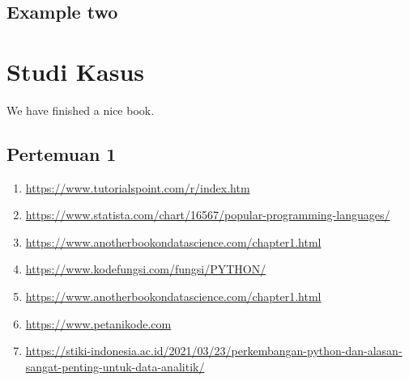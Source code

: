 \documentclass[
]{docs}
\providecommand{\tightlist}{%
  \setlength{\itemsep}{0pt}\setlength{\parskip}{0pt}}
\begin{document}
\hypertarget{example-two}{%
\subsection{Example two}\label{example-two}}

\hypertarget{studi-kasus}{%
\section{Studi Kasus}\label{studi-kasus}}

We have finished a nice book.

\hypertarget{pertemuan-1}{%
\subsection{Pertemuan 1}\label{pertemuan-1}}

\begin{enumerate}
\def\labelenumi{\arabic{enumi}.}
\tightlist
\item
  \url{https://www.tutorialspoint.com/r/index.htm}
\item
  \url{https://www.statista.com/chart/16567/popular-programming-languages/}
\item
  \url{https://www.anotherbookondatascience.com/chapter1.html}
\item
  \url{https://www.kodefungsi.com/fungsi/PYTHON/}
\item
  \url{https://www.anotherbookondatascience.com/chapter1.html}
\item
  \url{https://www.petanikode.com}
\item
  \url{https://stiki-indonesia.ac.id/2021/03/23/perkembangan-python-dan-alasan-sangat-penting-untuk-data-analitik/}
\end{enumerate}
\end{document}
